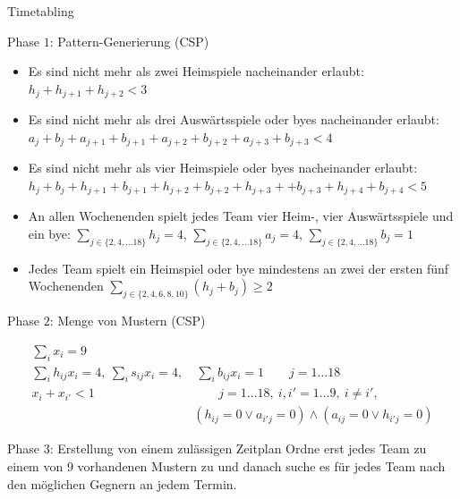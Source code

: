 \documentclass[hyperref={pdfpagelabels=false}]{beamer}
\begin{document}
\begin{frame}[allowframebreaks]{Timetabling}
\begin{block}{Phase $1$: Pattern-Generierung (CSP)}
\begin{itemize}
\item Es sind nicht mehr als zwei Heimspiele nacheinander erlaubt:\\ $h_{j}+h_{j+1}+h_{j+2}<3$ 
\end{itemize}
\end{block}

\newpage

\begin{block}{}
\begin{itemize}
\item Es sind nicht mehr als drei Auswärtsspiele oder byes  nacheinander erlaubt: \\
$a_j+b_j+a_{j+1}+b_{j+1}+a_{j+2}+b_{j+2}+a_{j+3}+b_{j+3}<4$ 

\item Es sind nicht mehr als vier Heimspiele oder byes nacheinander erlaubt:\\
$h_j+b_j+h_{j+1}+b_{j+1}+h_{j+2}+b_{j+2} +h_{j+3} ++b_{j+3} +h_{j+4}+b_{j+4} <5 $

\item An allen Wochenenden spielt jedes Team vier Heim-, vier Auswärtsspiele und ein bye:   $\sum_{j\in\{2,4,\dots 18\}}h_j = 4$, $\sum_{j\in\{2,4,\dots 18\}}a_j = 4$, $\sum_{j\in\{2,4,\dots 18\}}b_j = 1$

\item Jedes Team spielt ein Heimspiel oder bye mindestens an zwei der ersten fünf Wochenenden $\sum_{j\in\{2,4,6,8,10\}}(h_j+b_j) \ge 2$
\end{itemize}
\end{block}


\begin{block}{Phase $2$:  Menge von Mustern (CSP)}

\begin{align}
  \sum_{i}x_i=9 &  \nonumber \\
  \sum_{i}h_{ij}x_i = 4,\ \sum_{i}s_{ij}x_i = 4, &\ \sum_{i}b_{ij}x_i = 1 \qquad  j=1\dots 18 \nonumber \\
  x_i+x_{i'} <1  &\qquad  j=1\dots 18,\ i,i'=1\dots 9,\ i\not=i', \nonumber\\
  & (h_{ij}=0 \vee a_{i'j}=0)\wedge(a_{ij}=0 \vee h_{i'j}=0) \nonumber  
\end{align}
\end{block}

\newpage

\begin{block}{Phase $3$: Erstellung von einem zulässigen Zeitplan}
Ordne erst jedes Team zu einem von $9$ vorhandenen Mustern zu und danach suche es für jedes Team nach den möglichen Gegnern an jedem Termin.


\end{block}
\end{frame}
\end{document}
